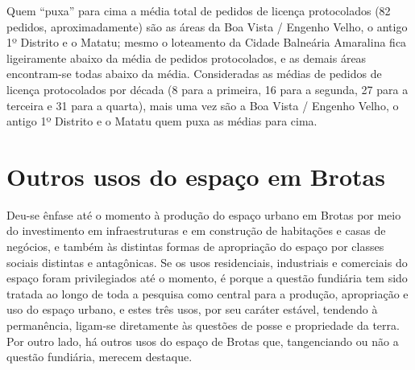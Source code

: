 Quem ``puxa'' para cima a média total de pedidos de licença protocolados (82 pedidos, aproximadamente) são as áreas da Boa Vista / Engenho Velho, o antigo 1º Distrito e o Matatu; mesmo o loteamento da Cidade Balneária Amaralina fica ligeiramente abaixo da média de pedidos protocolados, e as demais áreas encontram-se todas abaixo da média. Consideradas as médias de pedidos de licença protocolados por década (8 para a primeira, 16 para a segunda, 27 para a terceira e 31 para a quarta), mais uma vez são a Boa Vista / Engenho Velho, o antigo 1º Distrito e o Matatu quem puxa as médias para cima.

\section{Outros usos do espaço em Brotas}

Deu-se ênfase até o momento à produção do espaço urbano em Brotas por meio do investimento em infraestruturas e em construção de habitações e casas de negócios, e também às distintas formas de apropriação do espaço por classes sociais distintas e antagônicas. Se os usos residenciais, industriais e comerciais do espaço foram privilegiados até o momento, é porque a questão fundiária tem sido tratada ao longo de toda a pesquisa como central para a produção, apropriação e uso do espaço urbano, e estes três usos, por seu caráter estável, tendendo à permanência, ligam-se diretamente às questões de posse e propriedade da terra. Por outro lado, há outros usos do espaço de Brotas que, tangenciando ou não a questão fundiária, merecem destaque.

